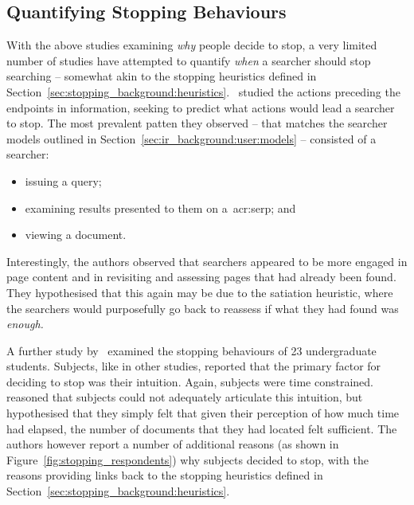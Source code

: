 \subsection{Quantifying Stopping Behaviours}
With the above studies examining \emph{why} people decide to stop, a very limited number of studies have attempted to quantify \emph{when} a searcher should stop searching -- somewhat akin to the stopping heuristics defined in Section~\ref{sec:stopping_background:heuristics}.~\cite{toms2009predicting_stopping} studied the actions preceding the endpoints in information, seeking to predict what actions would lead a searcher to stop. The most prevalent patten they observed -- that matches the searcher models outlined in Section~\ref{sec:ir_background:user:models} -- consisted of a searcher:

\vspace{-5mm}
\begin{itemize}
    \item{issuing a query;}
    \item{examining results presented to them on a~\gls{acr:serp}; and}
    \item{viewing a document.}
\end{itemize}
\vspace{-5mm}

Interestingly, the authors observed that searchers appeared to be more engaged in page content and in revisiting and assessing pages that had already been found. They hypothesised that this again may be due to the satiation heuristic, where the searchers would purposefully go back to reassess if what they had found was \emph{enough.}

A further study by~\cite{dostert2009satisficing} examined the stopping behaviours of 23 undergraduate students. Subjects, like in other studies, reported that the primary factor for deciding to stop was their intuition. Again, subjects were time constrained.~\cite{dostert2009satisficing} reasoned that subjects could not adequately articulate this intuition, but hypothesised that they simply felt that given their perception of how much time had elapsed, the number of documents that they had located felt sufficient. The authors however report a number of additional reasons (as shown in Figure~\ref{fig:stopping_respondents}) why subjects decided to stop, with the reasons providing links back to the stopping heuristics defined in Section~\ref{sec:stopping_background:heuristics}.

